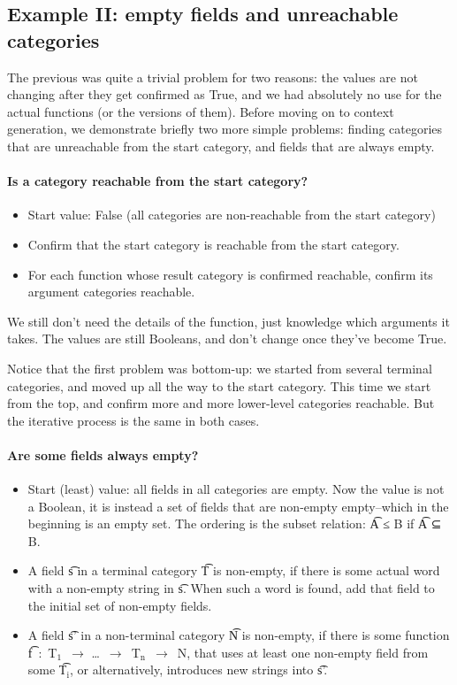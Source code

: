 \subsection{Example II: empty fields and unreachable categories}

The previous was quite a trivial problem for two reasons: the values are not changing after they get confirmed as True, and we had absolutely no use for the actual \gf{} functions (or the \pmcfg{} versions of them).
Before moving on to context generation, we demonstrate briefly two more simple problems: finding categories that are unreachable from the start category, and fields that are always empty.

\paragraph{Is a category reachable from the start category?}

\begin{itemize}
\item Start value: False (all categories are non-reachable from the start category)
\item Confirm that the start category is reachable from the start category.
\item For each function whose result category is confirmed reachable, confirm its argument categories reachable.
\end{itemize}

We still don’t need the details of the function, just knowledge which arguments it takes. The values are still Booleans, and don’t change once they’ve become True.

Notice that the first problem was bottom-up: we started from several terminal categories, and moved up all the way to the start category. This time we start from the top, and confirm more and more lower-level categories reachable. But the iterative process is the same in both cases.

\paragraph{Are some fields always empty?}

\begin{itemize}
\item Start (least) value: all fields in all categories are empty. Now the value is not a Boolean, it is instead a set of fields that are non-empty empty–which in the beginning is an empty set. The ordering is the subset relation: \t{A ≤ B} if \t{A ⊆ B}.
 \item A field \t{s} in a terminal category \t{T} is non-empty, if there is some actual word with a non-empty string in \t{s}. When such a word is found, add that field to the initial set of non-empty fields.
\item A field \t{s'} in a non-terminal category \t{N} is non-empty, if there is some function \t{f~:~T$_\text{1}$~$\rightarrow$ \dots~$\rightarrow$~T$_\text{n}$~$\rightarrow$~N}, that uses at least one non-empty field from some \t{T$_\text{i}$}, or alternatively, introduces new strings into \t{s'}.
\end{itemize}

